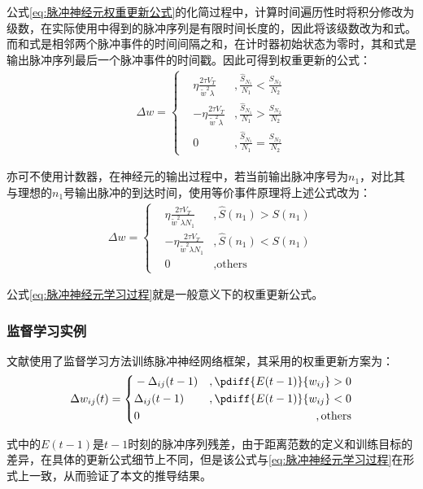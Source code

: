 \documentclass[11pt]{article}
\begin{document}
公式\ref{eq:脉冲神经元权重更新公式}的化简过程中，计算时间遍历性时将积分修改为级数，在实际使用中得到的脉冲序列是有限时间长度的，因此将该级数改为和式。而和式是相邻两个脉冲事件的时间间隔之和，在计时器初始状态为零时，其和式是输出脉冲序列最后一个脉冲事件的时间戳。因此可得到权重更新的公式：
\begin{align}
  \Delta w=\left\{
  \begin{aligned}
     & \eta\frac{2\tau V_T}{\tilde{w}^2\lambda} & ,\frac{\hat{S}_{N_1}}{N_1}<\frac{S_{N_2}}{N_2}\\
     & -\eta\frac{2\tau V_T}{\tilde{w}^2\lambda} & ,\frac{\hat{S}_{N_1}}{N_1}>\frac{S_{N_2}}{N_2} \\
     & 0        & ,\frac{\hat{S}_{N_1}}{N_1}=\frac{S_{N_2}}{N_2}
  \end{aligned}\right.
\end{align}\par
亦可不使用计数器，在神经元的输出过程中，若当前输出脉冲序号为$n_1$，对比其与理想的$n_1$号输出脉冲的到达时间，使用等价事件原理将上述公式改为：
\begin{align}
  \Delta w=\left\{
  \begin{aligned}
     & \eta\frac{2\tau V_T}{\tilde{w}^2\lambda N_1} & ,  \hat{S}(n_1)>S(n_1)\\
     & -\eta\frac{2\tau V_T}{\tilde{w}^2\lambda N_1} & ,\hat{S}(n_1)<S(n_1) \\
     & 0        & ,\text{others} 
  \end{aligned}\right.
  \label{eq:脉冲神经元学习过程}
\end{align}\par
公式\ref{eq:脉冲神经元学习过程}就是一般意义下的权重更新公式。
\subsubsection{监督学习实例}
文献\cite{mckennochFastModificationsSpikeProp2006}使用了监督学习方法训练脉冲神经网络框架，其采用的权重更新方案为：
\begin{align}
  \Delta w_{ij}(t)=\left\{\begin{aligned}
    & -\Delta_{ij}(t-1) & ,\pdiff{E(t-1)}{w_{ij}}>0 \\
    & \Delta_{ij}(t-1) & ,\pdiff{E(t-1)}{w_{ij}}<0 \\
    & 0        & ,\text{others}
 \end{aligned}\right.
\end{align}\par
式中的$E(t-1)$是$t-1$时刻的脉冲序列残差，由于距离范数的定义和训练目标的差异，在具体的更新公式细节上不同，但是该公式与\ref{eq:脉冲神经元学习过程}在形式上一致，从而验证了本文的推导结果。
\end{document}

